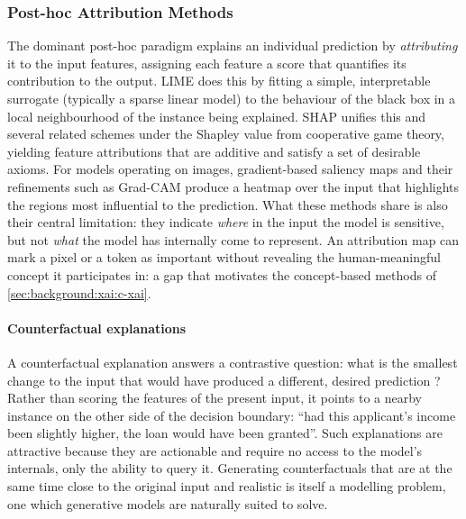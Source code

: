 \subsubsection{Post-hoc Attribution Methods}
\label{sec:background:xai:trad-xai:post-hoc}

The dominant post-hoc paradigm explains an individual prediction by
\textit{attributing} it to the input features, assigning each feature a score
that quantifies its contribution to the output. LIME
\citep{ribeiroWhyShouldTrust2016} does this by fitting a simple, interpretable
surrogate (typically a sparse linear model) to the behaviour of the black box in
a local neighbourhood of the instance being explained. SHAP
\citep{lundbergUnifiedApproachInterpreting2017} unifies this and several related
schemes under the Shapley value from cooperative game theory, yielding feature
attributions that are additive and satisfy a set of desirable axioms. For models
operating on images, gradient-based saliency maps
\citep{simonyanDeepConvolutionalNetworks2014} and their refinements such as
Grad-CAM \citep{selvarajuGradCAMVisualExplanations2017} produce a heatmap over
the input that highlights the regions most influential to the prediction. What
these methods share is also their central limitation: they indicate
\textit{where} in the input the model is sensitive, but not \textit{what} the
model has internally come to represent. An attribution map can mark a pixel or a
token as important without revealing the human-meaningful concept it
participates in: a gap that motivates the concept-based methods of
\cref{sec:background:xai:c-xai}.

    \paragraph{Counterfactual explanations} A counterfactual explanation answers
    a contrastive question: what is the smallest change to the input that would
    have produced a different, desired prediction
    \citep{wachterCounterfactualExplanationsOpening2017}? Rather than scoring
    the features of the present input, it points to a nearby instance on the
    other side of the decision boundary: ``had this applicant's income been
    slightly higher, the loan would have been granted''. Such explanations are
    attractive because they are actionable and require no access to the model's
    internals, only the ability to query it. Generating counterfactuals that are
    at the same time close to the original input and realistic is itself a
    modelling problem, one which generative models are naturally suited to
    solve.

